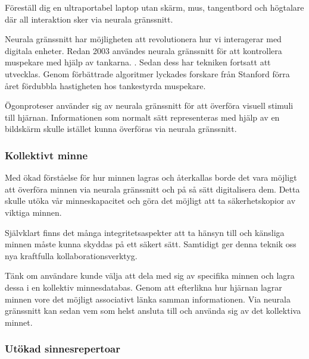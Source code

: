\documentclass[12pt, a4paper]{article}
\begin{document}
Föreställ dig en ultraportabel laptop utan skärm, mus, tangentbord och högtalare
där all interaktion sker via neurala gränssnitt.

Neurala gränssnitt har möjligheten att revolutionera hur vi interagerar med
digitala enheter. Redan 2003 användes neurala gränssnitt för att kontrollera
muspekare med hjälp av tankarna. \cite{cursor1}. Sedan dess har tekniken
fortsatt att utvecklas. Genom förbättrade algoritmer lyckades forskare från
Stanford förra året fördubbla hastigheten hos tankestyrda muspekare.
\cite{fast_cursor}

Ögonproteser använder sig av neurala gränssnitt för att överföra visuell stimuli
till hjärnan. \cite{prosthetic_operation} Informationen som normalt sätt
representeras med hjälp av en bildskärm skulle istället kunna överföras via
neurala gränssnitt.

%
%

\subsubsection{Kollektivt minne}

Med ökad förståelse för hur minnen lagras och återkallas borde det vara möjligt
att överföra minnen via neurala gränssnitt och på så sätt digitalisera dem.
Detta skulle utöka vår minneskapacitet och göra det möjligt att ta
säkerhetskopior av viktiga minnen.

Självklart finns det många integritetsaspekter att ta hänsyn till och känsliga
minnen måste kunna skyddas på ett säkert sätt. Samtidigt ger denna teknik oss
nya kraftfulla kollaborationsverktyg.

Tänk om användare kunde välja att dela med sig av specifika minnen och lagra
dessa i en kollektiv minnesdatabas. Genom att efterlikna hur hjärnan lagrar
minnen vore det möjligt associativt länka samman informationen. Via neurala
gränssnitt kan sedan vem som helst ansluta till och använda sig av det
kollektiva minnet.


\subsubsection{Utökad sinnesrepertoar}
\end{document}

